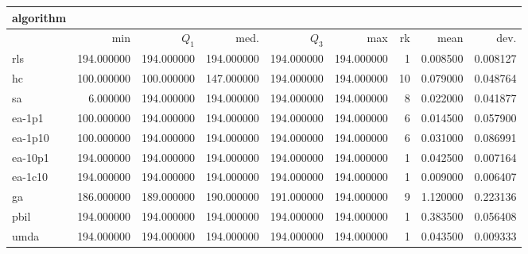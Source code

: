 \begin{tabular}{@{}l*{5}{>{{}}N{3}{0}}>{{}}N{2}{0}N{1}{3}N{1}{3}@{}}
\toprule
{algorithm} &  &  \\
\midrule
& {min} & {$Q_1$} & {med.} & {$Q_3$} & {max} & {rk} & {mean} & {dev.} \\
\midrule
rls & {\color{blue}} 194.000000 & {\color{blue}} 194.000000 & {\color{blue}} 194.000000 & {\color{blue}} 194.000000 & {\color{blue}} 194.000000 & 1 & 0.008500 & 0.008127 \\
 hc & 100.000000 & 100.000000 & 147.000000 & {\color{blue}} 194.000000 & {\color{blue}} 194.000000 & 10 & 0.079000 & 0.048764 \\
 sa & 6.000000 & {\color{blue}} 194.000000 & {\color{blue}} 194.000000 & {\color{blue}} 194.000000 & {\color{blue}} 194.000000 & 8 & 0.022000 & 0.041877 \\
 ea-1p1 & 100.000000 & {\color{blue}} 194.000000 & {\color{blue}} 194.000000 & {\color{blue}} 194.000000 & {\color{blue}} 194.000000 & 6 & 0.014500 & 0.057900 \\
 ea-1p10 & 100.000000 & {\color{blue}} 194.000000 & {\color{blue}} 194.000000 & {\color{blue}} 194.000000 & {\color{blue}} 194.000000 & 6 & 0.031000 & 0.086991 \\
 ea-10p1 & {\color{blue}} 194.000000 & {\color{blue}} 194.000000 & {\color{blue}} 194.000000 & {\color{blue}} 194.000000 & {\color{blue}} 194.000000 & 1 & 0.042500 & 0.007164 \\
 ea-1c10 & {\color{blue}} 194.000000 & {\color{blue}} 194.000000 & {\color{blue}} 194.000000 & {\color{blue}} 194.000000 & {\color{blue}} 194.000000 & 1 & 0.009000 & 0.006407 \\
 ga & 186.000000 & 189.000000 & 190.000000 & 191.000000 & {\color{blue}} 194.000000 & 9 & 1.120000 & 0.223136 \\
 pbil & {\color{blue}} 194.000000 & {\color{blue}} 194.000000 & {\color{blue}} 194.000000 & {\color{blue}} 194.000000 & {\color{blue}} 194.000000 & 1 & 0.383500 & 0.056408 \\
 umda & {\color{blue}} 194.000000 & {\color{blue}} 194.000000 & {\color{blue}} 194.000000 & {\color{blue}} 194.000000 & {\color{blue}} 194.000000 & 1 & 0.043500 & 0.009333 \\
 \bottomrule
\end{tabular}
